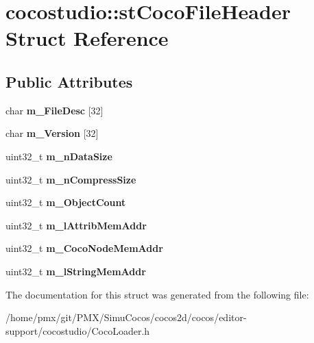 \hypertarget{structcocostudio_1_1stCocoFileHeader}{}\section{cocostudio\+:\+:st\+Coco\+File\+Header Struct Reference}
\label{structcocostudio_1_1stCocoFileHeader}
\subsection*{Public Attributes}
\begin{DoxyCompactItemize}
\item 
\mbox{\label{structcocostudio_1_1stCocoFileHeader_a3c76094dddcadfbe5dec19e95f69fb7e}} 
char {\bfseries m\+\_\+\+File\+Desc} \mbox{[}32\mbox{]}
\item 
\mbox{\label{structcocostudio_1_1stCocoFileHeader_a27a3b998d9099b2588c6a7b2241f48da}} 
char {\bfseries m\+\_\+\+Version} \mbox{[}32\mbox{]}
\item 
\mbox{\label{structcocostudio_1_1stCocoFileHeader_a38664975e79683d121069ff9b877f46e}} 
uint32\+\_\+t {\bfseries m\+\_\+n\+Data\+Size}
\item 
\mbox{\label{structcocostudio_1_1stCocoFileHeader_afe1d917c498800c997e1585c865a7b5d}} 
uint32\+\_\+t {\bfseries m\+\_\+n\+Compress\+Size}
\item 
\mbox{\label{structcocostudio_1_1stCocoFileHeader_a5f3ac5acbb0110466eab83d0c5c3189d}} 
uint32\+\_\+t {\bfseries m\+\_\+\+Object\+Count}
\item 
\mbox{\label{structcocostudio_1_1stCocoFileHeader_a66854362f1a1426b62aceaf11af907d4}} 
uint32\+\_\+t {\bfseries m\+\_\+l\+Attrib\+Mem\+Addr}
\item 
\mbox{\label{structcocostudio_1_1stCocoFileHeader_a17a9eac776d2624b06141a7317c08dbd}} 
uint32\+\_\+t {\bfseries m\+\_\+\+Coco\+Node\+Mem\+Addr}
\item 
\mbox{\label{structcocostudio_1_1stCocoFileHeader_ace34c4093b5ec32ae673721a406f1545}} 
uint32\+\_\+t {\bfseries m\+\_\+l\+String\+Mem\+Addr}
\end{DoxyCompactItemize}


The documentation for this struct was generated from the following file\+:\begin{DoxyCompactItemize}
\item 
/home/pmx/git/\+P\+M\+X/\+Simu\+Cocos/cocos2d/cocos/editor-\/support/cocostudio/Coco\+Loader.\+h\end{DoxyCompactItemize}
